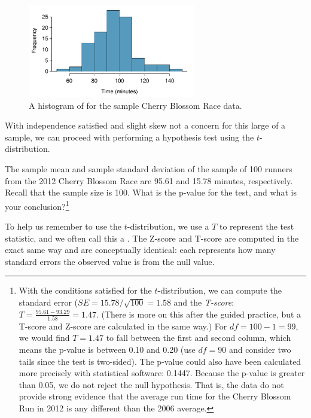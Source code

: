 \begin{figure}[h]
\centering
\includegraphics[width=0.65\textwidth]{ch_inference_for_means/figures/run10SampTimeHistogram/run10SampTimeHistogram} 
\caption{A histogram of  for the sample Cherry Blossom Race data.}
\label{run10SampTimeHistogram}
\end{figure}

With independence satisfied and slight skew not a concern for this large of a sample, we can proceed with performing a hypothesis test using the $t$-distribution.

\begin{exercise}
The sample mean and sample standard deviation of the sample of 100 runners from the 2012 Cherry Blossom Race are 95.61 and 15.78 minutes, respectively. Recall that the sample size is 100. What is the p-value for the test, and what is your conclusion?\footnote{With the conditions satisfied for the $t$-distribution, we can compute the standard error ($SE = 15.78 / \sqrt{100} = 1.58$ and the \emph{T-score}: $T = \frac{95.61 - 93.29}{1.58} = 1.47$. (There is more on this after the guided practice, but a T-score and Z-score are calculated in the same way.) For $df = 100 - 1 = 99$, we would find $T = 1.47$ to fall between the first and second column, which means the p-value is between 0.10 and 0.20 (use $df = 90$ and consider two tails since the test is two-sided). The p-value could also have been calculated more precisely with statistical software: 0.1447. Because the p-value is greater than 0.05, we do not reject the null hypothesis. That is, the data do not provide strong evidence that the average run time for the Cherry Blossom Run in 2012 is any different than the 2006 average.}
\end{exercise}

\begin{termBox}{
To help us remember to use the $t$-distribution, we use a $T$ to represent the test statistic, and we often call this a . The Z-score and T-score are computed in the exact same way and are conceptually identical: each represents how many standard errors the observed value is from the null value.}
\end{termBox}

